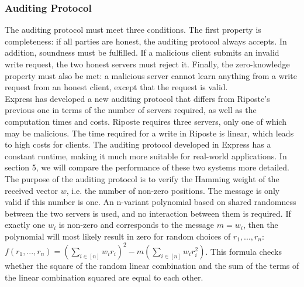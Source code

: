 \documentclass[a4paper]{article}
\begin{document}
\subsubsection{Auditing Protocol}
The auditing protocol must meet three conditions. The first property is completeness: if all parties are honest, the auditing protocol always accepts. In addition, soundness must be fulfilled. If a malicious client submits an invalid write request, the two honest servers must reject it. Finally, the zero-knowledge property must also be met: a malicious server cannot learn anything from a write request from an honest client, except that the request is valid. \\
Express has developed a new auditing protocol that differs from Riposte's previous one in terms of the number of servers required, as well as the computation times and costs. Riposte requires three servers, only one of which may be malicious. The time required for a write in Riposte is linear, which leads to high costs for clients. The auditing protocol developed in Express has a constant runtime, making it much more suitable for real-world applications. In section 5, we will compare the performance of these two systems more detailed. \\
The purpose of the auditing protocol is to verify the Hamming weight of the received vector $w$, i.e. the number of non-zero positions. The message is only valid if this number is one. An n-variant polynomial based on shared randomness between the two servers is used, and no interaction between them is required. If exactly one $w_i$ is non-zero and corresponds to the message $m = w_i$, then the polynomial will most likely result in zero for random choices of $r_1, ..., r_n$: $f(r_1, ..., r_n) = (\sum_{i \in [n]}w_i r_i)^2 - m(\sum_{i \in [n]}w_i r_i^2)$.  This formula checks whether the square of the random linear combination and the sum of the terms of the linear combination squared are equal to each other. 
\end{document}
